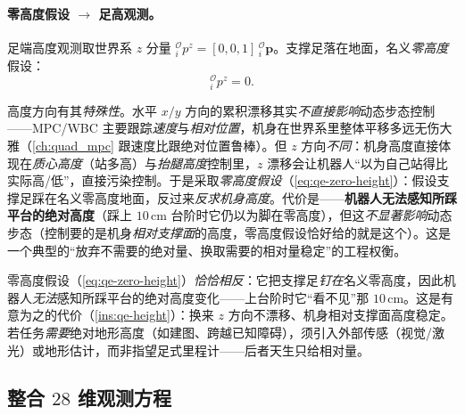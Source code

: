 \paragraph{零高度假设 $\to$ 足高观测。}
足端高度观测取世界系 $z$ 分量 ${}^{\mathcal{O}}_{i}p^z=[0,0,1]\,{}^{\mathcal{O}}_{i}\boldsymbol p$。支撑足落在地面，名义\emph{零高度}假设\cite{yu2021quadruped}：
\begin{equation}
  {}^{\mathcal{O}}_{i}p^z = 0.
  \label{eq:qe-zero-height}
\end{equation}

\begin{insight}[高度漂移的特殊危害与零高度假设]\label{ins:qe-height}
高度方向有其\emph{特殊性}。水平 $x/y$ 方向的累积漂移其实\emph{不直接影响}动态步态控制——MPC/WBC 主要跟踪\emph{速度}与\emph{相对位置}，机身在世界系里整体平移多远无伤大雅（\cref{ch:quad_mpc} 跟速度比跟绝对位置鲁棒）。但 $z$ 方向\emph{不同}：机身高度直接体现在\emph{质心高度}（站多高）与\emph{抬腿高度}控制里，$z$ 漂移会让机器人“以为自己站得比实际高/低”，直接污染控制。于是采取\emph{零高度假设}（\cref{eq:qe-zero-height}）：假设支撑足踩在名义零高度地面，反过来\emph{反求机身高度}。代价是——\textbf{机器人无法感知所踩平台的绝对高度}（踩上 $10\,\mathrm{cm}$ 台阶时它仍以为脚在零高度），但这\emph{不显著影响}动态步态（控制要的是机身\emph{相对支撑面}的高度，零高度假设恰好给的就是这个）。这是一个典型的“放弃不需要的绝对量、换取需要的相对量稳定”的工程权衡。
\end{insight}

\begin{pitfall}[误区：零高度假设让机器人能测台阶高度]
零高度假设（\cref{eq:qe-zero-height}）\emph{恰恰相反}：它把支撑足\emph{钉在}名义零高度，因此机器人\emph{无法}感知所踩平台的绝对高度变化——上台阶时它“看不见”那 $10\,\mathrm{cm}$。这是有意为之的代价（\cref{ins:qe-height}）：换来 $z$ 方向不漂移、机身相对支撑面高度稳定。若任务\emph{需要}绝对地形高度（如建图、跨越已知障碍），须引入外部传感（视觉/激光）或地形估计，而非指望足式里程计——后者天生只给相对量。
\end{pitfall}

\subsection{整合 \texorpdfstring{$28$}{28} 维观测方程}
\label{subsec:qe-obs-assemble}

